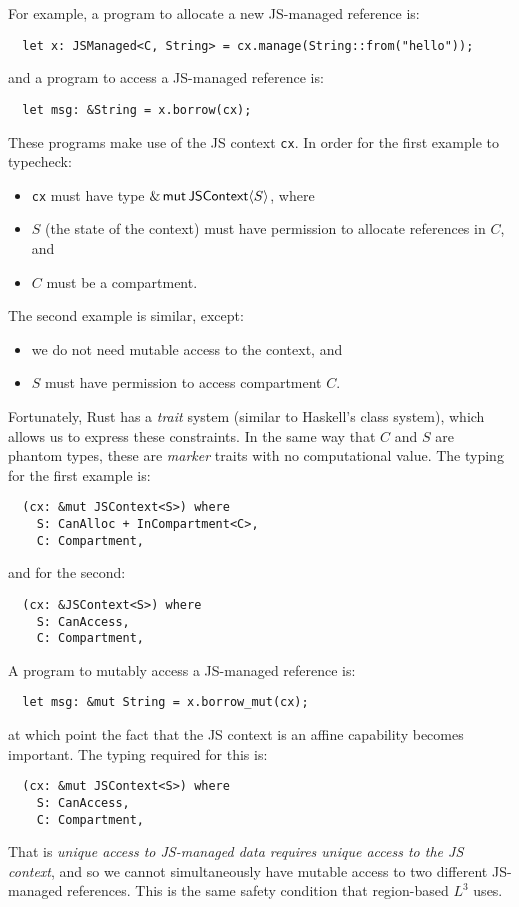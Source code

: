 For example, a program to allocate a new JS-managed reference is:
\begin{verbatim}
  let x: JSManaged<C, String> = cx.manage(String::from("hello"));
\end{verbatim}
and a program to access a JS-managed reference is:
\begin{verbatim}
  let msg: &String = x.borrow(cx);
\end{verbatim}
These programs make use of the JS context \verb|cx|. In order for the
first example to typecheck:
\begin{itemize}

\item \verb|cx| must have type $\&\,\mathsf{mut}\,\mathsf{JSContext}\langle S\rangle$, where
\item $S$ (the state of the context) must have permission to allocate
  references in $C$, and
\item $C$ must be a compartment.

\end{itemize}
The second example is similar, except:
\begin{itemize}

\item we do not need mutable access to the context, and
\item $S$ must have permission to access compartment $C$.

\end{itemize}
Fortunately, Rust has a \emph{trait} system (similar to Haskell's
class system), which allows us to express these constraints.  In the
same way that $C$ and $S$ are phantom types, these are \emph{marker}
traits with no computational value. The typing for
the first example is:
\begin{verbatim}
  (cx: &mut JSContext<S>) where
    S: CanAlloc + InCompartment<C>,
    C: Compartment,
\end{verbatim}
and for the second:
\begin{verbatim}
  (cx: &JSContext<S>) where
    S: CanAccess,
    C: Compartment,
\end{verbatim}
A program to mutably access a JS-managed reference is:
\begin{verbatim}
  let msg: &mut String = x.borrow_mut(cx);
\end{verbatim}
at which point the fact that the JS context is an affine capability
becomes important. The typing required for this is:
\begin{verbatim}
  (cx: &mut JSContext<S>) where
    S: CanAccess,
    C: Compartment,
\end{verbatim}
That is \emph{unique access to JS-managed data requires unique access to the JS context},
and so we cannot simultaneously have mutable access to two different JS-managed
references. This is the same safety condition that region-based $L^3$ uses.

